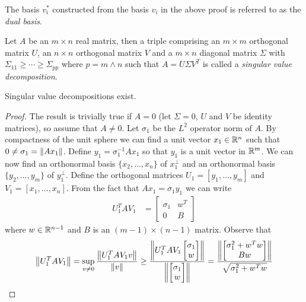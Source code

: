 The basis $v^*_i$ constructed from the basis $v_i$ in the above proof is referred to as the \emph{dual basis}.  

\begin{defn}Let $A$ be an $m \times n$ real matrix, then a triple comprising an $m \times m$ orthogonal matrix $U$, an $n \times n$ orthogonal matrix $V$ and a $m \times n$ diagonal matrix $\Sigma$ with $\Sigma_{11} \geq \dotsb \geq \Sigma_{pp}$ where $p = m \wedge n$ such that $A = U \Sigma V^T$ is called a \emph{singular value decomposition}.
\end{defn}

\begin{thm}\label{SingularValueDecomposition}Singular value decompositions exist.
\end{thm}
\begin{proof}
The result is trivially true if $A = 0$ (let $\Sigma=0$, $U$ and $V$ be identity matrices), so assume that $A \neq 0$.  Let $\sigma_1$ be the $L^2$ operator norm of $A$.   By compactness of the unit sphere we can find a unit vector $x_1 \in \mathbb{R}^n$ such that $0 \neq \sigma_1 = \left \lVert Ax_1 \right \rVert$.  Define $y_1 = \sigma^{-1}_1 Ax_1$ so that $y_1$ is a unit vector in $\mathbb{R}^m$.  We can now find an orthonormal basis $\lbrace x_2, \dotsc, x_n \rbrace$ of $x_1^{\perp}$ and an orthonormal basis $\lbrace y_2, \dotsc, y_m \rbrace$ of $y_1^{\perp}$.  Define the orthogonal matrices $U_1 = [y_1, \dotsc, y_m]$ and $V_1 = [x_1, \dotsc, x_n]$.  From the fact that $Ax_1 = \sigma_1 y_1$ we can write 
\begin{align*}
U_1^T A V_1 &=
\begin{bmatrix}
\sigma_1 & w^T \\
0 & B
\end{bmatrix}
\end{align*}
where $w \in \mathbb{R}^{n-1}$ and $B$ is an $(m-1) \times (n-1)$ matrix.
Observe that
\begin{align*}
\norm{U_1^T A V_1} &= \sup_{v \neq 0} \frac{\norm{U_1^T A V_1 v}}{\norm{v}} \geq \frac{\norm{U_1^T A V_1 \begin{bmatrix} \sigma_1 \\ w\end{bmatrix}}}{\norm{\begin{bmatrix} \sigma_1 \\ w\end{bmatrix}}} 
=\frac{\norm{\begin{bmatrix} \sigma_1^2 + w^T w \\ 
B w
 \end{bmatrix}}}{\sqrt{\sigma_1^2 + w^T w}} \\

\end{align*}
\end{proof}
